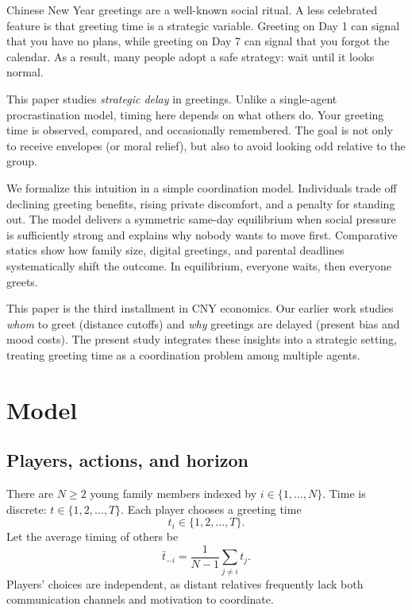 \documentclass[AER]{AEA}
\begin{document}


Chinese New Year greetings are a well-known social ritual. A less celebrated feature is that greeting time is a strategic variable. Greeting on Day 1 can signal that you have no plans, while greeting on Day 7 can signal that you forgot the calendar. As a result, many people adopt a safe strategy: wait until it looks normal.

This paper studies \emph{strategic delay} in greetings. Unlike a single-agent procrastination model, timing here depends on what others do. Your greeting time is observed, compared, and occasionally remembered. The goal is not only to receive envelopes (or moral relief), but also to avoid looking odd relative to the group.

We formalize this intuition in a simple coordination model. Individuals trade off declining greeting benefits, rising private discomfort, and a penalty for standing out. The model delivers a symmetric same-day equilibrium when social pressure is sufficiently strong and explains why nobody wants to move first. Comparative statics show how family size, digital greetings, and parental deadlines systematically shift the outcome. In equilibrium, everyone waits, then everyone greets.

This paper is the third installment in CNY economics. Our earlier work studies \emph{whom} to greet (distance cutoffs) and \emph{why} greetings are delayed (present bias and mood costs). The present study integrates these insights into a strategic setting, treating greeting time as a coordination problem among multiple agents.

\section{Model}

\subsection{Players, actions, and horizon}
There are $N\ge2$ young family members indexed by $i\in\{1,\dots,N\}$. Time is discrete:
$t\in\{1,2,\dots,T\}$. Each player chooses a greeting time
\[
t_i\in\{1,2,\dots,T\}.
\]
Let the average timing of others be
\[
\bar t_{-i}=\frac{1}{N-1}\sum_{j\ne i} t_j .
\]
Players' choices are independent, as distant relatives frequently lack both communication channels and motivation to coordinate.
\end{document}

